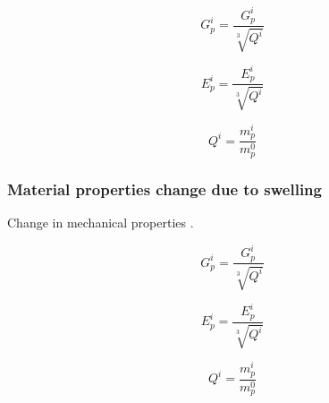 \documentclass[preprint,12pt]{elsarticle}
\begin{document}
\begin{equation}
\label{eqn:shear_swelling_change}
  G_p^i = \frac{G_p^i}{\sqrt[3]{Q^i}}
\end{equation}

\begin{equation}
\label{eqn:young_swelling_change}
  E_p^i = \frac{E_p^i}{\sqrt[3]{Q^i}}
\end{equation}


\begin{equation}
\label{eqn:young_swelling_change}
  Q^i = \frac{m_p^i}{m_p^0}
\end{equation}

\subsubsection*{Material properties change due to swelling}
Change in mechanical properties \cite{sweijen2017grain}.


\begin{equation}
\label{eqn:shear_swelling_change}
  G_p^i = \frac{G_p^i}{\sqrt[3]{Q^i}}
\end{equation}

\begin{equation}
\label{eqn:young_swelling_change}
  E_p^i = \frac{E_p^i}{\sqrt[3]{Q^i}}
\end{equation}


\begin{equation}
\label{eqn:young_swelling_change}
  Q^i = \frac{m_p^i}{m_p^0}
\end{equation}
\end{document}
